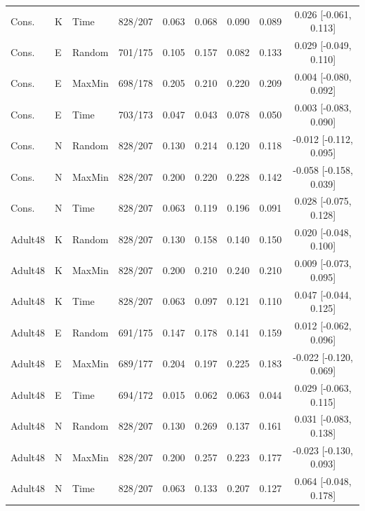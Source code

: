 \begin{longtable}{llllccccc}
Cons. & K & Time & 828/207 & 0.063 & 0.068 & 0.090 & 0.089 & 0.026 [-0.061, 0.113] \\

Cons. & E & Random & 701/175 & 0.105 & 0.157 & 0.082 & 0.133 & 0.029 [-0.049, 0.110] \\

Cons. & E & MaxMin & 698/178 & 0.205 & 0.210 & 0.220 & 0.209 & 0.004 [-0.080, 0.092] \\

Cons. & E & Time & 703/173 & 0.047 & 0.043 & 0.078 & 0.050 & 0.003 [-0.083, 0.090] \\

Cons. & N & Random & 828/207 & 0.130 & 0.214 & 0.120 & 0.118 & -0.012 [-0.112, 0.095] \\

Cons. & N & MaxMin & 828/207 & 0.200 & 0.220 & 0.228 & 0.142 & -0.058 [-0.158, 0.039] \\

Cons. & N & Time & 828/207 & 0.063 & 0.119 & 0.196 & 0.091 & 0.028 [-0.075, 0.128] \\

Adult48 & K & Random & 828/207 & 0.130 & 0.158 & 0.140 & 0.150 & 0.020 [-0.048, 0.100] \\

Adult48 & K & MaxMin & 828/207 & 0.200 & 0.210 & 0.240 & 0.210 & 0.009 [-0.073, 0.095] \\

Adult48 & K & Time & 828/207 & 0.063 & 0.097 & 0.121 & 0.110 & 0.047 [-0.044, 0.125] \\

Adult48 & E & Random & 691/175 & 0.147 & 0.178 & 0.141 & 0.159 & 0.012 [-0.062, 0.096] \\

Adult48 & E & MaxMin & 689/177 & 0.204 & 0.197 & 0.225 & 0.183 & -0.022 [-0.120, 0.069] \\

Adult48 & E & Time & 694/172 & 0.015 & 0.062 & 0.063 & 0.044 & 0.029 [-0.063, 0.115] \\

Adult48 & N & Random & 828/207 & 0.130 & 0.269 & 0.137 & 0.161 & 0.031 [-0.083, 0.138] \\

Adult48 & N & MaxMin & 828/207 & 0.200 & 0.257 & 0.223 & 0.177 & -0.023 [-0.130, 0.093] \\

Adult48 & N & Time & 828/207 & 0.063 & 0.133 & 0.207 & 0.127 & 0.064 [-0.048, 0.178] \\


\end{longtable}
